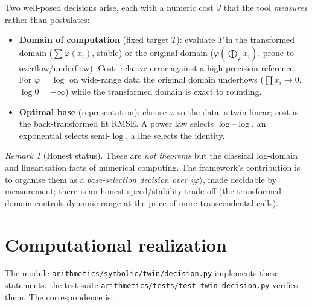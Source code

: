 \documentclass[11pt,a4paper]{article}
\newcommand{\code}[1]{\texttt{#1}}
\theoremstyle{plain}
\theoremstyle{definition}
\theoremstyle{remark}
\newtheorem{remark}[theorem]{Remark}
\begin{document}
Two well-posed decisions arise, each with a numeric cost $J$ that the tool
\emph{measures} rather than postulates:

\begin{itemize}
\item \textbf{Domain of computation} (fixed target $T$): evaluate $T$ in the
transformed domain ($\sum\varphi(x_i)$, stable) or the original domain
($\varphi(\bigoplus_\varphi x_i)$, prone to overflow/underflow). Cost: relative
error against a high-precision reference. For $\varphi=\log$ on wide-range data
the original domain underflows ($\prod x_i\to 0$, $\log 0=-\infty$) while the
transformed domain is exact to rounding.
\item \textbf{Optimal base} (representation): choose $\varphi$ so the data is
twin-linear; cost is the back-transformed fit RMSE. A power law selects
$\log$--$\log$, an exponential selects semi-$\log$, a line selects the identity.
\end{itemize}

\begin{remark}[Honest status]
These are \emph{not theorems} but the classical log-domain and linearisation
facts of numerical computing. The framework's contribution is to organise them
as a \emph{base-selection decision over $\langle\varphi\rangle$}, made decidable
by measurement; there is an honest speed/stability trade-off (the transformed
domain controls dynamic range at the price of more transcendental calls).
\end{remark}

\section{Computational realization}

The module \code{arithmetics/symbolic/twin/decision.py} implements these
statements; the test suite \code{arithmetics/tests/test\_twin\_decision.py}
verifies them. The correspondence is:
\end{document}

